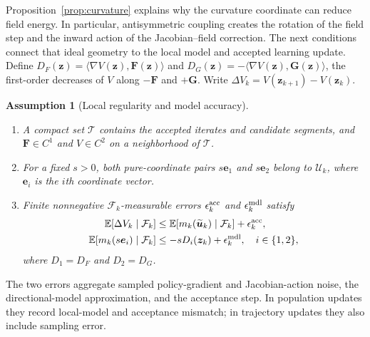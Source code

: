 \documentclass[conference]{IEEEtran}
\newcommand{\bF}{\bm{F}}
\newcommand{\bG}{\bm{G}}
\newcommand{\bz}{\bm{z}}
\newcommand{\bu}{\bm{u}}
\newcommand{\E}{\mathbb{E}}
\newtheorem{assumption}{Assumption}
\begin{document}
Proposition~\ref{prop:curvature} explains why the curvature coordinate can reduce field energy.
In particular, antisymmetric coupling creates the rotation of the field step and the inward action of the Jacobian--field correction.
The next conditions connect that ideal geometry to the local model and accepted learning update.
Define $D_F(\bz)=\langle\nabla V(\bz),\bF(\bz)\rangle$ and $D_G(\bz)=-\langle\nabla V(\bz),\bG(\bz)\rangle$, the first-order decreases of $V$ along $-\bF$ and $+\bG$.
Write $\Delta V_k=V(\bz_{k+1})-V(\bz_k)$.
\begin{assumption}[Local regularity and model accuracy]
\label{ass:model}
\begin{enumerate}
\item[(a)] A compact set $\mathcal T$ contains the accepted iterates and candidate segments, and $\bF\in C^1$ and $V\in C^2$ on a neighborhood of $\mathcal T$.
\item[(b)] For a fixed $s>0$, both pure-coordinate pairs $s\boldsymbol e_1$ and $s\boldsymbol e_2$ belong to $\mathcal U_k$, where $\boldsymbol e_i$ is the $i$th coordinate vector.
\item[(c)] Finite nonnegative $\mathcal F_k$-measurable errors $\epsilon_k^{\rm acc}$ and $\epsilon_k^{\rm mdl}$ satisfy
\[
\begin{aligned}
\E[\Delta V_k\mid\mathcal F_k]
&\leq \E[m_k(\widetilde{\bu}_k)\mid\mathcal F_k]+\epsilon_k^{\rm acc},\\
\E[m_k(s\boldsymbol e_i)\mid\mathcal F_k]
&\leq-sD_i(\bz_k)+\epsilon_k^{\rm mdl},\quad i\in\{1,2\},
\end{aligned}
\]
where $D_1=D_F$ and $D_2=D_G$.
\end{enumerate}
\end{assumption}
The two errors aggregate sampled policy-gradient and Jacobian-action noise, the directional-model approximation, and the acceptance step.
In population updates they record local-model and acceptance mismatch; in trajectory updates they also include sampling error.
\end{document}
